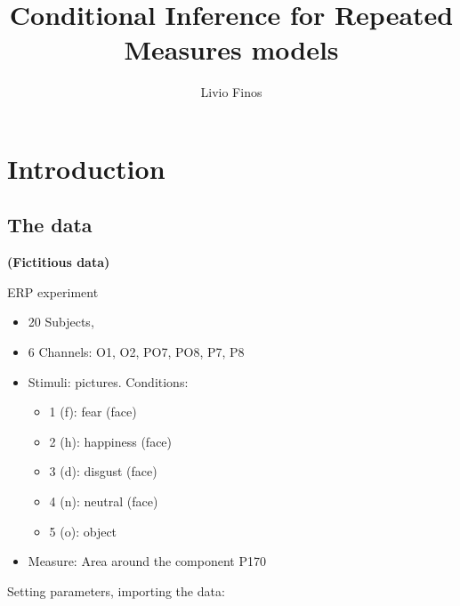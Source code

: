 \documentclass[
]{article}
\title{Conditional Inference for Repeated Measures models}
\author{Livio Finos}
\date{}
\newenvironment{Shaded}{\begin{snugshade}}{\end{snugshade}}
\newcommand{\AttributeTok}[1]{\textcolor[rgb]{0.77,0.63,0.00}{#1}}
\newcommand{\ConstantTok}[1]{\textcolor[rgb]{0.00,0.00,0.00}{#1}}
\newcommand{\FunctionTok}[1]{\textcolor[rgb]{0.00,0.00,0.00}{#1}}
\newcommand{\NormalTok}[1]{#1}
\newcommand{\SpecialCharTok}[1]{\textcolor[rgb]{0.00,0.00,0.00}{#1}}
\providecommand{\tightlist}{%
  \setlength{\itemsep}{0pt}\setlength{\parskip}{0pt}}
\begin{document}
\maketitle

{
\setcounter{tocdepth}{2}
\tableofcontents
}
\hypertarget{introduction}{%
\section{Introduction}\label{introduction}}

\begin{Shaded}
\end{Shaded}

\hypertarget{the-data}{%
\subsection{The data}\label{the-data}}

\textbf{(Fictitious data)}

ERP experiment

\begin{itemize}
\tightlist
\item
  20 Subjects,
\item
  6 Channels: O1, O2, PO7, PO8, P7, P8
\item
  Stimuli: pictures. Conditions:

  \begin{itemize}
  \tightlist
  \item
    1 (f): fear (face)
  \item
    2 (h): happiness (face)
  \item
    3 (d): disgust (face)
  \item
    4 (n): neutral (face)
  \item
    5 (o): object
  \end{itemize}
\item
  Measure: Area around the component P170
\end{itemize}

Setting parameters, importing the data:
\end{document}

